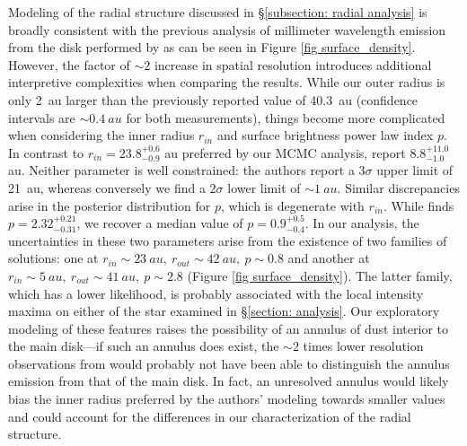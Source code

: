 \documentclass[modern]{aastex62}
\begin{document}
Modeling of the radial structure discussed in \S \ref{subsection: radial analysis} is broadly consistent with the previous analysis of millimeter wavelength emission from the disk performed by \cite{macgregor13} as can be seen in Figure \ref{fig surface_density}. 
However, the factor of $\sim 2$ increase in spatial resolution introduces additional interpretive complexities when comparing the results.
While our outer radius is only \SI{2}{au} larger than the previously reported value of \SI{40.3}{au} (confidence intervals are $\sim \SI{0.4}{au}$ for both measurements), things become more complicated when considering the inner radius $r_{in}$ and surface brightness power law index $p$.
In contrast to $r_{in} = 23.8_{-0.9}^{ +0.6}$ \si{au} preferred by our MCMC analysis, \cite{macgregor13} report $8.8_{-1.0} ^{+11.0}$ \si{au}.
Neither parameter is well constrained: the authors report a $3 \sigma$ upper limit of \SI{21}{au}, whereas conversely we find a $2 \sigma$ lower limit of $\sim \SI{1}{au}$.
Similar discrepancies arise in the posterior distribution for $p$, which is degenerate with $r_{in}$.
While \cite{macgregor13} finds $p=2.32_{-0.31}^{+0.21}$, we recover a median value of $p=0.9_{-0.4}^{+0.5}$.
In our analysis, the uncertainties in these two parameters arise from the existence of two families of solutions: one at $r_{in} \sim \SI{23}{au},\ r_{out} \sim \SI{42}{au},\ p \sim 0.8$ and another at $r_{in} \sim \SI{5}{au},\ r_{out} \sim \SI{41}{au},\ p \sim 2.8$ (Figure \ref{fig surface_density}).
The latter family, which has a lower likelihood, is probably associated with the local intensity maxima on either of the star examined in \S \ref{section: analysis}.
Our exploratory modeling of these features raises the possibility of an annulus of dust interior to the main disk---if such an annulus does exist, the $\sim 2$ times lower resolution observations from \cite{macgregor13} would probably not have been able to distinguish the annulus emission from that of the main disk.
In fact, an unresolved annulus would likely bias the inner radius preferred by the authors' modeling towards smaller values and could account for the differences in our characterization of the radial structure.
\end{document}
